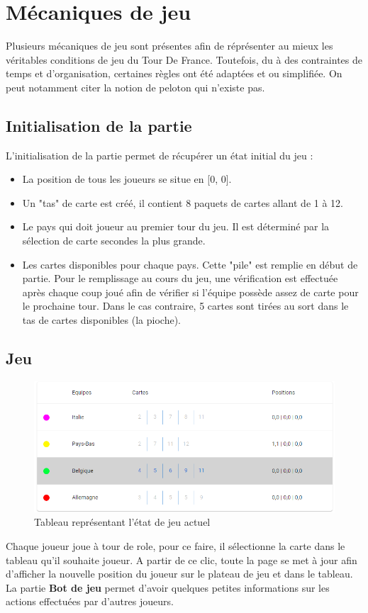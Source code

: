 \documentclass[a4paper, 11pt]{article}
\begin{document}
\section{Mécaniques de jeu}
Plusieurs mécaniques de jeu sont présentes afin de réprésenter au mieux les véritables conditions de jeu du Tour De France. Toutefois, du à des contraintes de temps et d'organisation, certaines
règles ont été adaptées et ou simplifiée. On peut notamment citer la notion de peloton qui n'existe pas.

\subsection{Initialisation de la partie}
L'initialisation de la partie permet de récupérer un état initial du jeu :
\begin{itemize}
	\item La position de tous les joueurs se situe en [0, 0].
	\item Un "tas" de carte est créé, il contient 8 paquets de cartes allant de 1 à 12.
	\item Le pays qui doit joueur au premier tour du jeu. Il est déterminé par la sélection de carte secondes la plus grande.
	\item Les cartes disponibles pour chaque pays. Cette "pile" est remplie en début de partie. Pour le remplissage au cours du jeu, une vérification est effectuée après chaque coup joué afin de vérifier si l'équipe possède assez de carte pour le prochaine tour. Dans le cas contraire, 5 cartes sont tirées au sort dans le tas de cartes disponibles (la pioche).
\end{itemize}

\subsection{Jeu}
\begin{figure}[!h]
	\centering
	\includegraphics[scale=.6]{assets/game-state-table}
	\caption{Tableau représentant l'état de jeu actuel}
\end{figure}
Chaque joueur joue à tour de role, pour ce faire, il sélectionne la carte dans le tableau qu'il souhaite joueur.
A partir de ce clic, toute la page se met à jour afin d'afficher la nouvelle position du joueur sur le plateau de jeu et dans le tableau.
La partie \textbf{Bot de jeu} permet d'avoir quelques petites informations sur les actions effectuées par d'autres joueurs.
\end{document}
